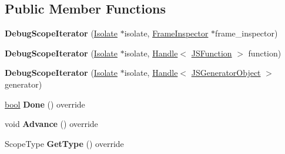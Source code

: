 \subsection*{Public Member Functions}
\begin{DoxyCompactItemize}
\item 
\mbox{\label{classv8_1_1internal_1_1DebugScopeIterator_a4ab705cc8b4fc8ef4b718533ca425337}} 
{\bfseries Debug\+Scope\+Iterator} (\mbox{\hyperlink{classv8_1_1internal_1_1Isolate}{Isolate}} $\ast$isolate, \mbox{\hyperlink{classv8_1_1internal_1_1FrameInspector}{Frame\+Inspector}} $\ast$frame\+\_\+inspector)
\item 
\mbox{\label{classv8_1_1internal_1_1DebugScopeIterator_afcc7cd95fadbd5880768ee78a89c8a84}} 
{\bfseries Debug\+Scope\+Iterator} (\mbox{\hyperlink{classv8_1_1internal_1_1Isolate}{Isolate}} $\ast$isolate, \mbox{\hyperlink{classv8_1_1internal_1_1Handle}{Handle}}$<$ \mbox{\hyperlink{classv8_1_1internal_1_1JSFunction}{J\+S\+Function}} $>$ function)
\item 
\mbox{\label{classv8_1_1internal_1_1DebugScopeIterator_a7fc803e6a6bb44c1d63cf1b6d9ec6b7d}} 
{\bfseries Debug\+Scope\+Iterator} (\mbox{\hyperlink{classv8_1_1internal_1_1Isolate}{Isolate}} $\ast$isolate, \mbox{\hyperlink{classv8_1_1internal_1_1Handle}{Handle}}$<$ \mbox{\hyperlink{classv8_1_1internal_1_1JSGeneratorObject}{J\+S\+Generator\+Object}} $>$ generator)
\item 
\mbox{\label{classv8_1_1internal_1_1DebugScopeIterator_aef1ad514f44a3f35e13ad50e6ce07124}} 
\mbox{\hyperlink{classbool}{bool}} {\bfseries Done} () override
\item 
\mbox{\label{classv8_1_1internal_1_1DebugScopeIterator_a7190b6ebfbf88983019a183d28dd9668}} 
void {\bfseries Advance} () override
\item 
\mbox{\label{classv8_1_1internal_1_1DebugScopeIterator_ac76fa53d87709b8d37c7a4a306762267}} 
Scope\+Type {\bfseries Get\+Type} () override
\item 
\mbox{\label{classv8_1_1internal_1_1DebugScopeIterator_a7e2306114db1830b317e15cba1021e62}} 

\end{DoxyCompactItemize}
